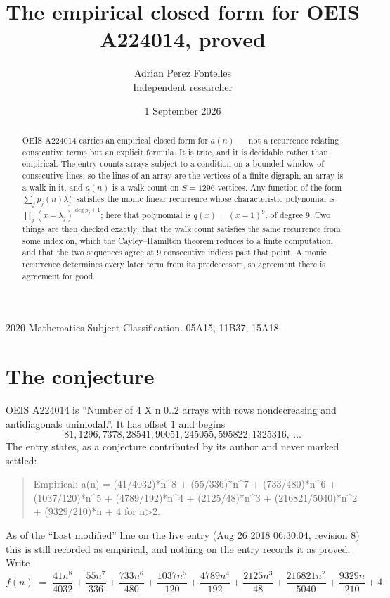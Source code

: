 \documentclass[11pt,a4paper]{article}
\title{The empirical closed form for OEIS A224014, proved}
\author{Adrian Perez Fontelles\\ \small Independent researcher}
\date{1 September 2026}
\theoremstyle{plain}
\theoremstyle{definition}
\begin{document}
\maketitle

\begin{abstract}
OEIS A224014 carries an empirical closed form for $a(n)$ --- not a recurrence relating
consecutive terms but an explicit formula. It is true, and it is decidable rather than
empirical. The entry counts arrays subject to a condition on a bounded window of consecutive lines, so the lines of an array are the
vertices of a finite digraph, an array is a walk in it, and $a(n)$ is a walk count on
$S=1296$ vertices. Any function of the form $\sum_j p_j(n)\lambda_j^{\,n}$ satisfies the
monic linear recurrence whose characteristic polynomial is
$\prod_j(x-\lambda_j)^{\deg p_j+1}$; here that polynomial is $q(x)=(x-1)^{9}$, of degree
$9$. Two things are then checked exactly: that the walk count satisfies the same
recurrence from some index on, which the Cayley--Hamilton theorem reduces to a finite
computation, and that the two sequences agree at $9$ consecutive indices past that
point. A monic recurrence determines every later term from its predecessors, so agreement
there is agreement for good.
\end{abstract}

\noindent\small 2020 Mathematics Subject Classification. 05A15, 11B37, 15A18.\normalsize

\section{The conjecture}

OEIS A224014 is ``Number of 4 X n 0..2 arrays with rows nondecreasing and antidiagonals unimodal.''. It has offset $1$ and begins
\[
81, 1296, 7378, 28541, 90051, 245055, 595822, 1325316,\ \dots
\]
The entry states, as a conjecture contributed by its author and never marked settled:
\begin{quote}
Empirical: a(n) = (41/4032)*n\^{}8 + (55/336)*n\^{}7 + (733/480)*n\^{}6 + (1037/120)*n\^{}5 + (4789/192)*n\^{}4 + (2125/48)*n\^{}3 + (216821/5040)*n\^{}2 + (9329/210)*n + 4 for n>2.
\end{quote}
As of the ``Last modified'' line on the live entry (Aug 26 2018 06:30:04, revision 8) this is still
recorded as empirical, and nothing on the entry records it as proved. Write
\[
f(n)\;=\;\frac{41 n^{8}}{4032} + \frac{55 n^{7}}{336} + \frac{733 n^{6}}{480} + \frac{1037 n^{5}}{120} + \frac{4789 n^{4}}{192} + \frac{2125 n^{3}}{48} + \frac{216821 n^{2}}{5040} + \frac{9329 n}{210} + 4.
\]
\end{document}
